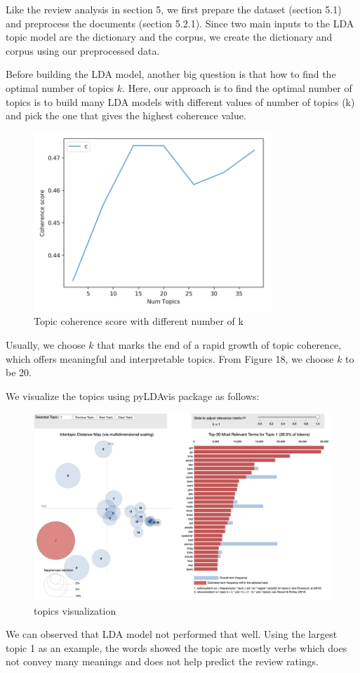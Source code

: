 \documentclass{article}
\begin{document}
Like the review analysis in section 5, we first prepare the dataset (section 5.1) and preprocess the documents (section 5.2.1). Since two main inputs to the LDA topic model are the dictionary and the corpus, we create the dictionary and corpus using our preprocessed data. 

Before building the LDA model, another big question is that how to find the optimal number of topics $k$. Here, our approach is to find the optimal number of topics is to build many LDA models with different values of number of topics (k) and pick the one that gives the highest coherence value.

\begin{figure}[!ht]
\centering
\includegraphics[width=9cm]{k.png}
\caption{Topic coherence score with different number of k}
\end{figure}

Usually, we choose $k$ that marks the end of a rapid growth of topic coherence, which offers meaningful and interpretable topics. From Figure 18, we choose $k$ to be 20. 

We visualize the topics using pyLDAvis package as follows: 
\begin{figure}[!ht]
\centering
\includegraphics[width=\textwidth]{lda.png}
\caption{topics visualization}
\end{figure}
We can observed that LDA model not performed that well. Using the largest topic 1 as an example, the words showed the topic are mostly verbs which does not convey many meanings and does not help predict the review ratings.
\end{document}
